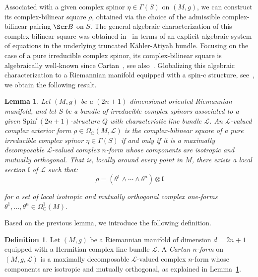 \documentclass[10pt,a4paper,twoside,reqno]{amsart}
\theoremstyle{plain}
\newtheorem{lemma}[thm]{Lemma}
\theoremstyle{definition}
\newtheorem{definition}[thm]{Definition}
\theoremstyle{remark}
\def\scB{\Scr B}
\def\cL{\mathcal{L}}
\begin{document}
Associated with a given complex spinor $\eta\in \Gamma(S)$ on $(M,g)$, we can construct its complex-bilinear square $\rho$, obtained via the choice of the admissible complex-bilinear pairing $\scB$ on $S$. The general algebraic characterization of this complex-bilinear square was obtained in~\cite[Thm.\ 4.12]{Algebraic_Complex_Square_2025} in terms of an explicit algebraic system of equations in the underlying truncated Kähler-Atiyah bundle. Focusing on the case of a pure irreducible complex spinor, its complex-bilinear square is algebraically well-known since Cartan~\cite{Cartan1938}, see also~\cite{Kopczynski1997}. Globalizing this algebraic characterization to a Riemannian manifold equipped with a spin-c structure, see~\cite{Complex_Differential_Spinors_2026}, we obtain the following result.

\begin{lemma}
\label{lemma:squaresriemannian2n1}
Let $(M,g)$ be a $(2n+1)$-dimensional oriented Riemannian manifold, and let $S$ be a bundle of irreducible complex spinors associated to a given $\mathrm{Spin}^c(2n+1)$-structure $Q$ with characteristic line bundle $\mathcal{L}$. An $\mathcal{L}$-valued complex exterior form $\rho \in \Omega_{\mathbb{C}}(M,\mathcal{L})$ is the complex-bilinear square of a pure irreducible complex spinor $\eta\in\Gamma(S)$ if and only if it is a maximally decomposable $\mathcal{L}$-valued complex $n$-form whose components are isotropic and mutually orthogonal. That is, locally around every point in $M$, there exists a local section $\mathfrak{l}$ of $\mathcal{L}$ such that:
\begin{equation*}
\rho = (\theta^1\wedge \cdots \wedge \theta^n) \otimes \mathfrak{l}
\end{equation*}

\noindent
for a set of local isotropic and mutually orthogonal complex one-forms $\theta^1,\ldots,\theta^n \in \Omega^1_{\mathbb{C}}(M)$.
\end{lemma}
 
Based on the previous lemma, we introduce the following definition. 
 
\begin{definition}
Let $(M,g)$ be a Riemannian manifold of dimension $d = 2n+1$ equipped with a Hermitian complex line bundle $\cL$. A \emph{Cartan $n$-form} on $(M,g,\cL)$ is a maximally decomposable $\mathcal{L}$-valued complex $n$-form whose components are isotropic and mutually orthogonal, as explained in Lemma~\ref{lemma:squaresriemannian2n1}.
\end{definition}
\end{document}
